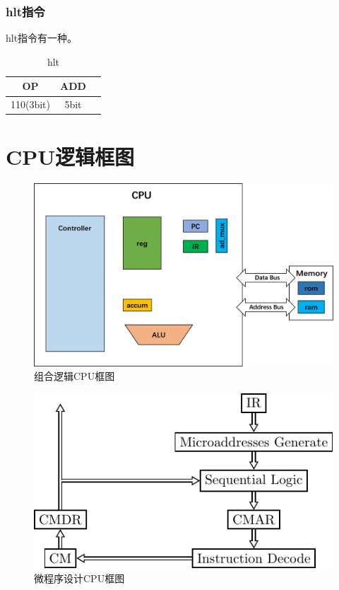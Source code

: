 \documentclass[UTF8]{ctexrep}
\begin{document}
\subsection{hlt指令}
hlt指令有一种。
\begin{table}[H]
\centering
\begin{tabular}{|c|c|c|}
\hline
OP        & ADD \\ \hline
110(3bit) & 5bit   \\ \hline
\end{tabular}
\caption{hlt}
\label{tab:21}
\end{table}

\chapter{CPU逻辑框图}

\begin{figure}[H]
\centering
\includegraphics[scale=0.6]{CPU-comp-right.png}
\caption{组合逻辑CPU框图}
\end{figure}

\begin{figure}[H]
\centering
\includegraphics[scale=1.5]{pic.pdf}
\caption{微程序设计CPU框图}
\end{figure}
\end{document}
